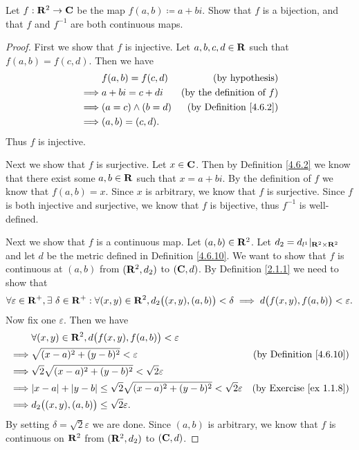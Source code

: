 \begin{exercise}\label{ex 4.6.11}
    Let \(f : \mathbf{R}^2 \to \mathbf{C}\) be the map \(f(a, b) \coloneqq a + bi\).
    Show that \(f\) is a bijection, and that \(f\) and \(f^{-1}\) are both continuous maps.
\end{exercise}

\begin{proof}
    First we show that \(f\) is injective.
    Let \(a, b, c, d \in \mathbf{R}\) such that \(f(a, b) = f(c, d)\).
    Then we have
    \begin{align*}
                 & f(a, b) = f(c, d)     & \text{(by hypothesis)}              \\
        \implies & a + bi = c + di       & \text{(by the definition of \(f\))} \\
        \implies & (a = c) \land (b = d) & \text{(by Definition \ref{4.6.2})}  \\
        \implies & (a, b) = (c, d).
    \end{align*}
    Thus \(f\) is injective.

    Next we show that \(f\) is surjective.
    Let \(x \in \mathbf{C}\).
    Then by Definition \ref{4.6.2} we know that there exist some \(a, b \in \mathbf{R}\) such that \(x = a + bi\).
    By the definition of \(f\) we know that \(f(a, b) = x\).
    Since \(x\) is arbitrary, we know that \(f\) is surjective.
    Since \(f\) is both injective and surjective, we know that \(f\) is bijective, thus \(f^{-1}\) is well-defined.

    Next we show that \(f\) is a continuous map.
    Let \((a, b) \in \mathbf{R}^2\).
    Let \(d_2 = d_{l^1}|_{\mathbf{R}^2 \times \mathbf{R}^2}\) and let \(d\) be the metric defined in Definition \ref{4.6.10}.
    We want to show that \(f\) is continuous at \((a, b)\) from \((\mathbf{R}^2, d_2)\) to \((\mathbf{C}, d)\).
    By Definition \ref{2.1.1} we need to show that
    \[
        \forall \varepsilon \in \mathbf{R}^+, \exists\ \delta \in \mathbf{R}^+ : \forall (x, y) \in \mathbf{R}^2, d_2\big((x, y), (a, b)\big) < \delta \implies d\big(f(x, y), f(a, b)\big) < \varepsilon.
    \]
    Now fix one \(\varepsilon\).
    Then we have
    \begin{align*}
                 & \forall (x, y) \in \R^2, d\big(f(x, y), f(a, b)\big) < \varepsilon                                                                \\
        \implies & \sqrt{(x - a)^2 + (y - b)^2} < \varepsilon                                                  & \text{(by Definition \ref{4.6.10})} \\
        \implies & \sqrt{2} \sqrt{(x - a)^2 + (y - b)^2} < \sqrt{2} \varepsilon                                                                      \\
        \implies & \abs{x - a} + \abs{y - b} \leq \sqrt{2} \sqrt{(x - a)^2 + (y - b)^2} < \sqrt{2} \varepsilon & \text{(by Exercise \ref{ex 1.1.8})} \\
        \implies & d_2\big((x, y), (a, b)\big) \leq \sqrt{2} \varepsilon.
    \end{align*}
    By setting \(\delta = \sqrt{2} \varepsilon\) we are done.
    Since \((a, b)\) is arbitrary, we know that \(f\) is continuous on \(\mathbf{R}^2\) from \((\mathbf{R}^2, d_2)\) to \((\mathbf{C}, d)\).


\end{proof}
